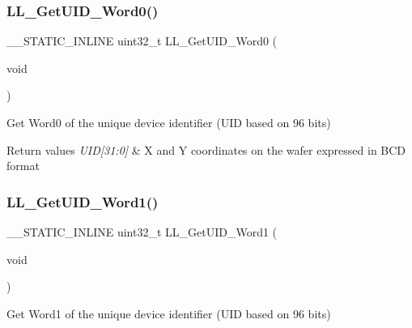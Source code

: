 \subsubsection{\texorpdfstring{L\+L\+\_\+\+Get\+U\+I\+D\+\_\+\+Word0()}{LL\_GetUID\_Word0()}}
{\footnotesize\ttfamily \+\_\+\+\_\+\+S\+T\+A\+T\+I\+C\+\_\+\+I\+N\+L\+I\+NE uint32\+\_\+t L\+L\+\_\+\+Get\+U\+I\+D\+\_\+\+Word0 (\begin{DoxyParamCaption}\item[{void}]{ }\end{DoxyParamCaption})}



Get Word0 of the unique device identifier (U\+ID based on 96 bits) 


\begin{DoxyRetVals}{Return values}
{\em U\+I\+D\mbox{[}31\+:0\mbox{]}} & X and Y coordinates on the wafer expressed in B\+CD format \\
\hline
\end{DoxyRetVals}
\mbox{\label{group___u_t_i_l_s___e_f___d_e_v_i_c_e___e_l_e_c_t_r_o_n_i_c___s_i_g_n_a_t_u_r_e_ga67007778e77a6fafc8a1fc440dc208b2}} 
\subsubsection{\texorpdfstring{L\+L\+\_\+\+Get\+U\+I\+D\+\_\+\+Word1()}{LL\_GetUID\_Word1()}}
{\footnotesize\ttfamily \+\_\+\+\_\+\+S\+T\+A\+T\+I\+C\+\_\+\+I\+N\+L\+I\+NE uint32\+\_\+t L\+L\+\_\+\+Get\+U\+I\+D\+\_\+\+Word1 (\begin{DoxyParamCaption}\item[{void}]{ }\end{DoxyParamCaption})}



Get Word1 of the unique device identifier (U\+ID based on 96 bits) 


